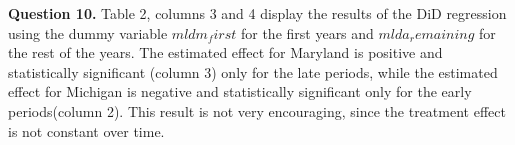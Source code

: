 \documentclass{article}
\theoremstyle{definition}
\begin{document}
 \hspace{0.41cm} \textbf{Question 10.} Table 2, columns 3 and 4 display the results of the DiD regression using the dummy variable $mldm_first$ for the first years and $mlda_remaining$ for the rest of the years.  The estimated effect for Maryland is positive and statistically significant (column 3) only for the late periods, while the estimated effect for Michigan is negative and statistically significant only for the early periods(column 2). This result is not very encouraging, since the treatment effect is not constant over time. 
 
\end{document}
